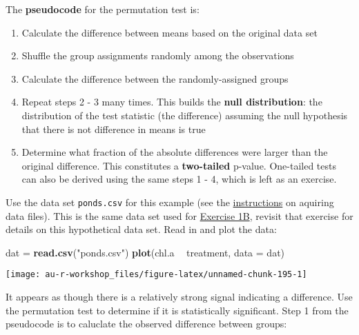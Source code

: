 \documentclass[]{book}
\newenvironment{Shaded}{\begin{snugshade}}{\end{snugshade}}
\newcommand{\KeywordTok}[1]{\textcolor[rgb]{0.13,0.29,0.53}{\textbf{#1}}}
\newcommand{\DataTypeTok}[1]{\textcolor[rgb]{0.13,0.29,0.53}{#1}}
\newcommand{\StringTok}[1]{\textcolor[rgb]{0.31,0.60,0.02}{#1}}
\newcommand{\OperatorTok}[1]{\textcolor[rgb]{0.81,0.36,0.00}{\textbf{#1}}}
\newcommand{\NormalTok}[1]{#1}
\providecommand{\tightlist}{%
  \setlength{\itemsep}{0pt}\setlength{\parskip}{0pt}}
\theoremstyle{definition}
\theoremstyle{definition}
\theoremstyle{definition}
\theoremstyle{remark}
\begin{document}
The \textbf{pseudocode} for the permutation test is:

\begin{enumerate}
\def\labelenumi{\arabic{enumi}.}
\tightlist
\item
  Calculate the difference between means based on the original data set
\item
  Shuffle the group assignments randomly among the observations
\item
  Calculate the difference between the randomly-assigned groups
\item
  Repeat steps 2 - 3 many times. This builds the \textbf{null
  distribution}: the distribution of the test statistic (the difference)
  assuming the null hypothesis that there is not difference in means is
  true
\item
  Determine what fraction of the absolute differences were larger than
  the original difference. This constitutes a \textbf{two-tailed}
  p-value. One-tailed tests can also be derived using the same steps 1 -
  4, which is left as an exercise.
\end{enumerate}

Use the data set \texttt{ponds.csv} for this example (see the
\protect\hyperlink{data-sets}{instructions} on aquiring data files).
This is the same data set used for \protect\hyperlink{ex1b}{Exercise
1B}, revisit that exercise for details on this hypothetical data set.
Read in and plot the data:

\begin{Shaded}
\begin{Highlighting}[]
\NormalTok{dat =}\StringTok{ }\KeywordTok{read.csv}\NormalTok{(}\StringTok{"ponds.csv"}\NormalTok{)}
\KeywordTok{plot}\NormalTok{(chl.a }\OperatorTok{~}\StringTok{ }\NormalTok{treatment, }\DataTypeTok{data =}\NormalTok{ dat)}
\end{Highlighting}
\end{Shaded}

\begin{center}\texttt{[image: au-r-workshop\_files/figure-latex/unnamed-chunk-195-1]} \end{center}

It appears as though there is a relatively strong signal indicating a
difference. Use the permutation test to determine if it is statistically
significant. Step 1 from the pseudocode is to caluclate the observed
difference between groups:

\begin{Shaded}
\end{Shaded}
\end{document}
